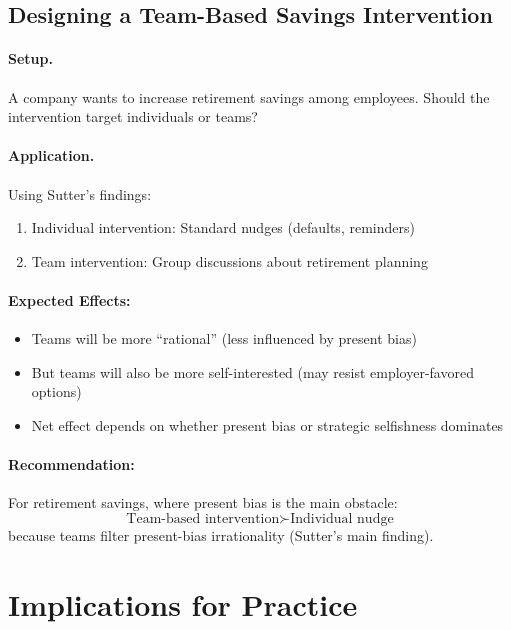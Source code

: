 \subsection{Designing a Team-Based Savings Intervention}

\paragraph{Setup.} A company wants to increase retirement savings among employees. Should the intervention target individuals or teams?

\paragraph{Application.} Using Sutter's findings:
\begin{enumerate}
\item Individual intervention: Standard nudges (defaults, reminders)
\item Team intervention: Group discussions about retirement planning
\end{enumerate}

\paragraph{Expected Effects:}
\begin{itemize}
\item Teams will be more ``rational'' (less influenced by present bias)
\item But teams will also be more self-interested (may resist employer-favored options)
\item Net effect depends on whether present bias or strategic selfishness dominates
\end{itemize}

\paragraph{Recommendation:}
For retirement savings, where present bias is the main obstacle:
\begin{equation}
\text{Team-based intervention} \succ \text{Individual nudge}
\end{equation}
because teams filter present-bias irrationality (Sutter's main finding).


\section{Implications for Practice}
\label{sec:su-practice}

